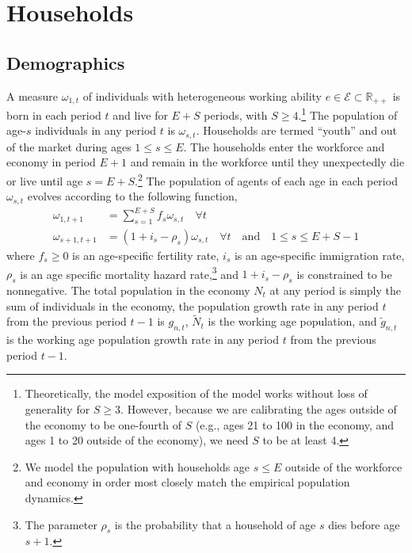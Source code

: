 \chapter{Households}
%

  \section{Demographics}
    A measure $\omega_{1,t}$ of individuals with heterogeneous working ability $e \in\mathcal{E}\subset\mathbb{R}_{++}$ is born in each period $t$ and live for $E+S$ periods, with $S\geq 4$.\footnote{Theoretically, the model exposition of the model works without loss of generality for $S\geq 3$. However, because we are calibrating the ages outside of the economy to be one-fourth of $S$ (e.g., ages 21 to 100 in the economy, and ages 1 to 20 outside of the economy), we need $S$ to be at least 4.} The population of age-$s$ individuals in any period $t$ is $\omega_{s,t}$. Households are termed ``youth'' and out of the market during ages $1\leq s\leq E$. The households enter the workforce and economy in period $E+1$ and remain in the workforce until they unexpectedly die or live until age $s=E+S$.\footnote{We model the population with households age $s\leq E$ outside of the workforce and economy in order most closely match the empirical population dynamics.} The population of agents of each age in each period $\omega_{s,t}$ evolves according to the following function,
    \begin{equation}\label{EqPopLawofmotion}
      \begin{split}
        \omega_{1,t+1} &= \sum_{s=1}^{E+S} f_s\omega_{s,t}\quad\forall t \\
        \omega_{s+1,t+1} &= (1 + i_s - \rho_s)\omega_{s,t}\quad\forall t\quad\text{and}\quad 1\leq s \leq E+S-1
      \end{split}
    \end{equation}
    where $f_s\geq 0$ is an age-specific fertility rate, $i_s$ is an age-specific immigration rate, $\rho_s$ is an age specific mortality hazard rate,\footnote{The parameter $\rho_s$ is the probability that a household of age $s$ dies before age $s+1$.} and $1+i_s-\rho_s$ is constrained to be nonnegative. The total population in the economy $N_t$ at any period is simply the sum of individuals in the economy, the population growth rate in any period $t$ from the previous period $t-1$ is $g_{n,t}$, $\tilde{N}_t$ is the working age population, and $\tilde{g}_{n,t}$ is the working age population growth rate in any period $t$ from the previous period $t-1$.
